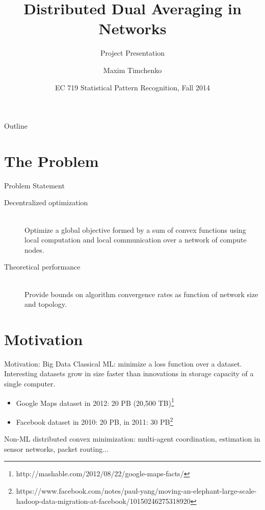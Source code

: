 \documentclass{beamer}
\title{Distributed Dual Averaging in Networks}
\subtitle{Project Presentation}
\author{Maxim Timchenko}
\institute{Electrical and Computer Engineering Department\\Boston University}
\date{EC 719 Statistical Pattern Recognition, Fall 2014}
\begin{document}
	\begin{frame}
		\titlepage
	\end{frame}
	
	\begin{frame}{Outline}
		\tableofcontents
	\end{frame}
	
	\section{The Problem}
	\begin{frame}{Problem Statement}
		\begin{description}
  			\item[Decentralized optimization]\hfill \\ Optimize a global objective
			formed by a sum of convex functions using local computation
			and local communication over a network of compute nodes.
			\pause
			\item[Theoretical performance] \hfill \\ Provide bounds on algorithm 
			convergence rates as function of network size and topology.
		\end{description}
	\end{frame}
	
	\section{Motivation}
	\begin{frame}{Motivation: Big Data}
		Classical ML: minimize a loss function over a dataset.\\
		Interesting datasets grow in size faster than innovations in 
		storage capacity of a single computer.
		\begin{itemize}
			\item Google Maps dataset in 2012: 20 PB (20,500 TB)\footnote{http://mashable.com/2012/08/22/google-maps-facts/}
			\item Facebook dataset in 2010: 20 PB, in 2011: 30 PB\footnote{https://www.facebook.com/notes/paul-yang/moving-an-elephant-large-scale-hadoop-data-migration-at-facebook/10150246275318920}
		\end{itemize}
		Non-ML distributed convex minimization: 
		multi-agent coordination, estimation in sensor networks,
		packet routing...
	\end{frame}	
\end{document}
